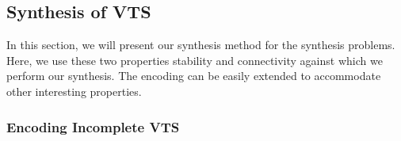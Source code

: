 \subsection{Synthesis of VTS}
In this section, we will present our synthesis method for
the synthesis problems.
%
%
%
Here, we use these two properties stability and connectivity against which we perform our synthesis. 
%
The encoding can be easily extended to accommodate other interesting properties. 

\subsubsection{Encoding Incomplete VTS}

